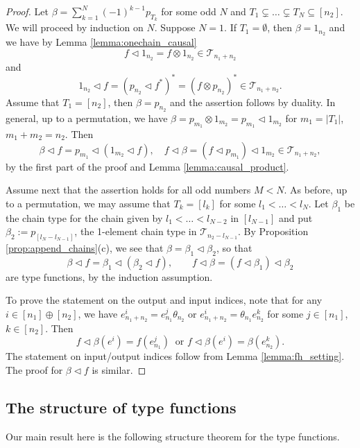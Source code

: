\documentclass[12pt]{article}
\theoremstyle{definition}
\theoremstyle{remark}
\def\Te{\mathcal T}
\def\vtl{\vartriangleleft}
\begin{document}
\begin{proof} Let  $\beta=\sum_{k=1}^{N}(-1)^{k-1}p_{T_k}$
for some odd $N$ and $T_1\subsetneq \dots \subsetneq T_N\subseteq [n_2]$. We will proceed by induction on $N$. Suppose $N=1$. If $T_1=\emptyset$,
then $\beta=1_{n_2}$ and we have by Lemma \ref{lemma:onechain_causal}
\[
f\vtl 1_{n_2}=f\otimes 1_{n_2}\in \Te_{n_1+n_2}
\]
and
\[
1_{n_2}\vtl f=(p_{n_2}\vtl f^*)^*=(f\otimes p_{n_2})^*\in \Te_{n_1+n_2}.
\]
Assume that  $T_1=[n_2]$, then $\beta=p_{n_2}$ and the assertion follows by duality. 
In general,  up to a permutation, we have $\beta=p_{m_1}\otimes
1_{m_2}=p_{m_1}\vtl 1_{m_2}$ for $m_1=|T_1|$, $m_1+m_2=n_2$. Then 
\[
\beta\vtl f=p_{m_1}\vtl (1_{m_2}\vtl f),\quad f\vtl \beta=(f\vtl p_{m_1})\vtl 1_{m_2} \in
\Te_{n_1+n_2},
\]
by the first part of the proof and Lemma \ref{lemma:causal_product}.

Assume next that the assertion holds for all odd numbers $M<N$. As before, up to a
permutation, we may assume that $T_k=[l_k]$ for some $l_1<\dots<l_{N}$. Let $\beta_1$ be the chain
type for the chain given by $l_1<\dots<l_{N-2}$ in $[l_{N-1}]$ and put
$\beta_2:=p_{[l_{N}-l_{N-1}]}$, the 1-element chain type in $\Te_{n_2-l_{N-1}}$. By
Proposition \ref{prop:append_chains}(c), we see
that $\beta=\beta_1\vtl\beta_2$, so that 
\[
\beta\vtl f=\beta_1\vtl(\beta_2\vtl f),\qquad f\vtl\beta=(f\vtl\beta_1)\vtl\beta_2
\]
are type functions, by the induction assumption. 


To prove the statement on the output and input indices, note that for any $i\in [n_1]\oplus [n_2]$, we have  $e^i_{n_1+n_2}=e^j_{n_1}\theta_{n_2}$ or
$e^i_{n_1+n_2}=\theta_{n_1}e^k_{n_2}$
for some $j\in [n_1]$, $k\in [n_2]$. Then   
\[
f\vtl\beta(e^i)=f(e^j_{n_1})\ \text{ or } f\vtl \beta(e^i)=\beta(e^k_{n_2}).
\]
The statement on input/output indices  follow from Lemma \ref{lemma:fh_setting}. The proof
for $\beta\vtl f$ is similar. 

\end{proof}


\subsection{The structure of type functions}

Our main result here is the  following structure theorem for the type functions.
\end{document}
